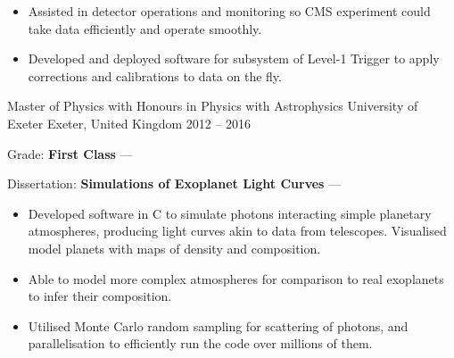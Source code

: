 \begin{cventries}
{\begin{cvitems}
            \vpaddingEduSubpoint
            \begin{itemize}[itemsep=\vPaddingLength, label=\bullet]
                \item{Assisted in detector operations and monitoring so CMS experiment could take data efficiently and operate smoothly.}
                \item{Developed and deployed software for subsystem of Level-1 Trigger to apply corrections and calibrations to data on the fly.}
            \end{itemize}
        \end{cvitems}
        }

    \cventry
        {Master of Physics with Honours in Physics with Astrophysics}
        {University of Exeter}
        {Exeter, United Kingdom}
        {2012 -- 2016}
        {
        \begin{cvitems} %
            \item {Grade: \textbf{First Class} --- }
            \item {Dissertation: \textbf{Simulations of Exoplanet Light Curves} --- }
            \vpaddingEduSubpoint
            \begin{itemize}[itemsep=\vPaddingLength, label=\bullet]
                \item{Developed software in C to simulate photons interacting simple planetary atmospheres, producing light curves akin to data from telescopes. Visualised model planets with maps of density and composition.}
                \item{Able to model more complex atmospheres for comparison to real exoplanets to infer their composition.}
                \item{Utilised Monte Carlo random sampling for scattering of photons, and parallelisation to efficiently run the code over millions of them.}
            \end{itemize}
        \end{cvitems}
        } %
\end{cventries}
